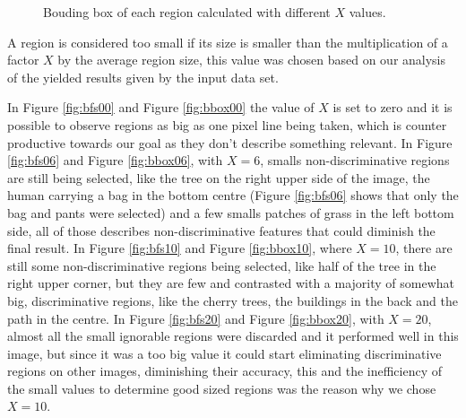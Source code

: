 \documentclass[12pt,a4paper]{article}
\begin{document}
\begin{figure}[!h]
{{		}
		\label{fig:bbox10}
	}
	\quad
	\caption{Bouding box of each region calculated with different $X$ values.}
	\label{fig:bbox}
\end{figure}

	A region is considered too small if its size is smaller than the multiplication of a factor $X$ by the average region size, this value was chosen based on our analysis of the yielded results given by the input data set.
	
	In Figure \ref{fig:bfs00} and Figure \ref{fig:bbox00} the value of $X$ is set to zero and it is possible to observe regions as big as one pixel line being taken, which is counter productive towards our goal as they don't describe something relevant. In Figure \ref{fig:bfs06} and Figure \ref{fig:bbox06}, with $X = 6$, smalls non-discriminative regions are still being selected, like the tree on the right upper side of the image, the human carrying a bag in the bottom centre (Figure \ref{fig:bfs06} shows that only the bag and pants were selected) and a few smalls patches of grass in the left bottom side, all of those describes non-discriminative features that could diminish the final result. In Figure \ref{fig:bfs10} and Figure \ref{fig:bbox10}, where $X = 10$, there are still some non-discriminative regions being selected, like half of the tree in the right upper corner, but they are few and contrasted with a majority of somewhat big, discriminative regions, like the cherry trees, the buildings in the back and the path in the centre. In Figure \ref{fig:bfs20} and Figure \ref{fig:bbox20}, with $X = 20$, almost all the small ignorable regions were discarded and it performed well in this image, but since it was a too big value it could start eliminating discriminative regions on other images, diminishing their accuracy, this and the inefficiency of the small values to determine good sized regions was the reason why we chose $X = 10$.
\end{document}

